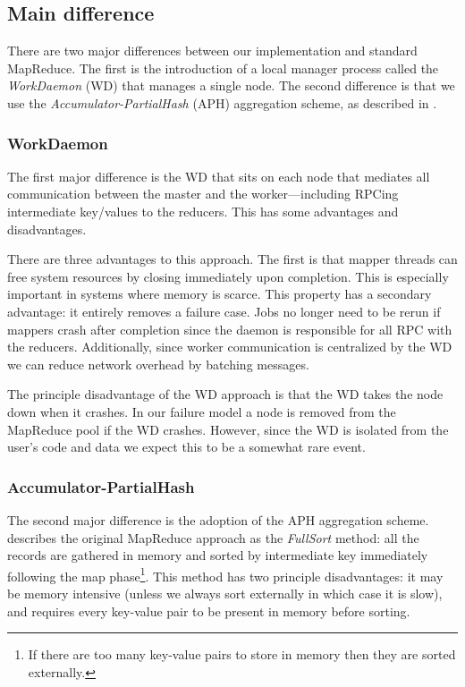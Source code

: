 \documentclass[10pt,letter,final,article,twocolumn]{article} %
\begin{document}
\subsection{Main difference}

There are two major differences between our implementation and standard MapReduce. The first is the introduction of a local manager process called the \emph{WorkDaemon} (WD) that manages a single node. The second difference is that we use the \emph{Accumulator-PartialHash} (APH) aggregation scheme, as described in \citet{yu2009distributed}.

\subsubsection{WorkDaemon}

The first major difference is the WD that sits on each node that mediates all communication between the master and the worker---including RPCing intermediate key/values to the reducers. This has some advantages and disadvantages.

There are three advantages to this approach. The first is that mapper threads can free system resources by closing immediately upon completion. This is especially important in systems where memory is scarce. This property has a secondary advantage: it entirely removes a failure case. Jobs no longer need to be rerun if mappers crash after completion since the daemon is responsible for all RPC with the reducers. Additionally, since worker communication is centralized by the WD we can reduce network overhead by batching messages.

The principle disadvantage of the WD approach is that the WD takes the node down when it crashes. In our failure model a node is removed from the MapReduce pool if the WD crashes. However, since the WD is isolated from the user's code and data we expect this to be a somewhat rare event.

\subsubsection{Accumulator-PartialHash}

The second major difference is the adoption of the APH aggregation scheme. \citet{yu2009distributed} describes the original MapReduce approach as the \emph{FullSort} method: all the records are gathered in memory and sorted by intermediate key immediately following the map phase\footnote{If there are too many key-value pairs to store in memory then they are sorted externally.}. This method has two principle disadvantages: it may be memory intensive (unless we always sort externally in which case it is slow), and requires every key-value pair to be present in memory before sorting. 
\end{document}
